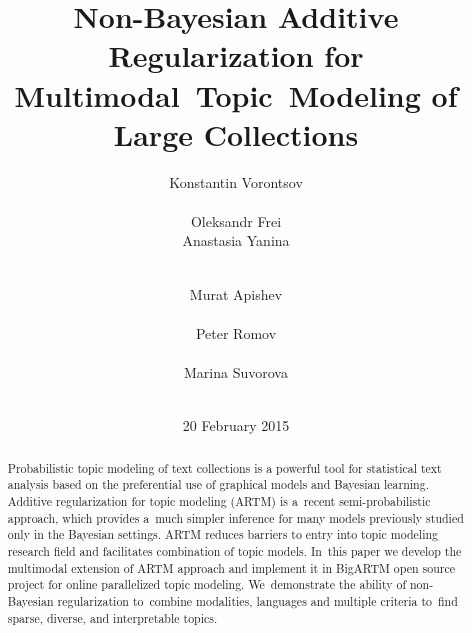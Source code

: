 \documentclass{acm_proc_article-sp}
\begin{document}
\title{
    Non-Bayesian Additive Regularization for Multimodal~Topic~Modeling of Large Collections
}
\author{
    \alignauthor
        Konstantin Vorontsov\\
        \\
    \alignauthor
        Oleksandr Frei\\
    \alignauthor
        Anastasia Yanina\\
        \\
    \and
    \alignauthor
        Murat Apishev\\
        \\
    \alignauthor
        Peter Romov\\
        \\
    \alignauthor
        Marina Suvorova\\
        \\
}
\date{20 February 2015}
\maketitle

\begin{abstract}
Probabilistic topic modeling of text collections is a powerful tool for statistical text analysis
based on the preferential use of graphical models and Bayesian learning.
Additive regularization for topic modeling (ARTM) is a~recent semi-probabilistic approach, which
provides a~much simpler inference for many models previously studied only in the Bayesian settings.
ARTM reduces barriers to entry into topic modeling research field
and facilitates combination of topic models.
In~this paper we develop the multimodal extension of ARTM approach
and implement it in \mbox{BigARTM} open source project %
for online parallelized topic modeling.
We~demonstrate the ability of non-Bayesian regularization
to~combine modalities, languages and multiple criteria
to~find sparse, diverse, and interpretable topics.
\end{abstract}
\end{document}
